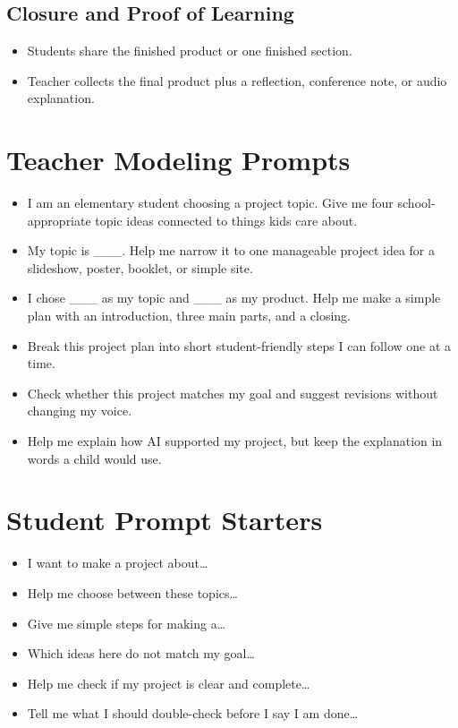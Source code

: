 \documentclass[11pt]{article}
\begin{document}
\subsection*{Closure and Proof of Learning}
\begin{itemize}
\item Students share the finished product or one finished section.
\item Teacher collects the final product plus a reflection, conference note, or audio explanation.
\end{itemize}

\section*{Teacher Modeling Prompts}
\begin{itemize}
\item I am an elementary student choosing a project topic. Give me four school-appropriate topic ideas connected to things kids care about.
\item My topic is \_\_\_. Help me narrow it to one manageable project idea for a slideshow, poster, booklet, or simple site.
\item I chose \_\_\_ as my topic and \_\_\_ as my product. Help me make a simple plan with an introduction, three main parts, and a closing.
\item Break this project plan into short student-friendly steps I can follow one at a time.
\item Check whether this project matches my goal and suggest revisions without changing my voice.
\item Help me explain how AI supported my project, but keep the explanation in words a child would use.
\end{itemize}

\section*{Student Prompt Starters}
\begin{itemize}
\item I want to make a project about\ldots
\item Help me choose between these topics\ldots
\item Give me simple steps for making a\ldots
\item Which ideas here do not match my goal\ldots
\item Help me check if my project is clear and complete\ldots
\item Tell me what I should double-check before I say I am done\ldots
\end{itemize}
\end{document}
